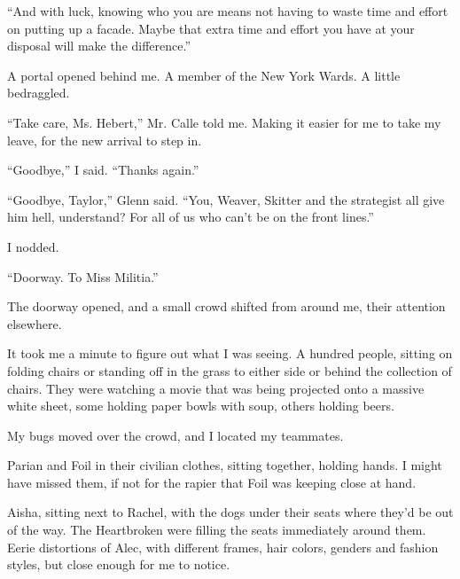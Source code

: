 ``And with luck, knowing who you are means not having to waste time and effort on putting up a facade.  Maybe that extra time and effort you have at your disposal will make the difference.''



A portal opened behind me.  A member of the New York Wards.  A little bedraggled.



``Take care, Ms. Hebert,'' Mr. Calle told me.  Making it easier for me to take my leave, for the new arrival to step in.



``Goodbye,'' I said.  ``Thanks again.''



``Goodbye, Taylor,'' Glenn said.  ``You, Weaver, Skitter and the strategist all give him hell, understand?  For all of us who can't be on the front lines.''



I nodded.



``Doorway.  To Miss Militia.''



\sectionbreak



The doorway opened, and a small crowd shifted from around me, their attention elsewhere.



It took me a minute to figure out what I was seeing.  A hundred people, sitting on folding chairs or standing off in the grass to either side or behind the collection of chairs.  They were watching a movie that was being projected onto a massive white sheet, some holding paper bowls with soup, others holding beers.



My bugs moved over the crowd, and I located my teammates.



Parian and Foil in their civilian clothes, sitting together, holding hands.  I might have missed them, if not for the rapier that Foil was keeping close at hand.



Aisha, sitting next to Rachel, with the dogs under their seats where they'd be out of the way.  The Heartbroken were filling the seats immediately around them.  Eerie distortions of Alec, with different frames, hair colors, genders and fashion styles, but close enough for me to notice.



